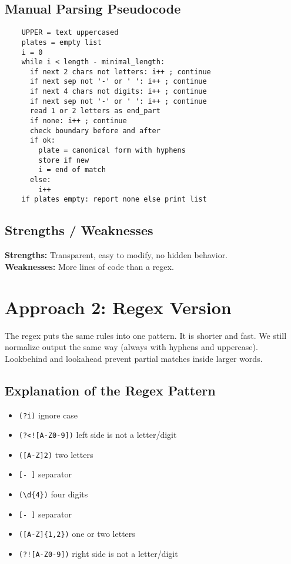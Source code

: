 \documentclass[12pt,a4paper]{article}
\begin{document}
\subsection{Manual Parsing Pseudocode}
\begin{verbatim}
    UPPER = text uppercased
    plates = empty list
    i = 0
    while i < length - minimal_length:
      if next 2 chars not letters: i++ ; continue
      if next sep not '-' or ' ': i++ ; continue
      if next 4 chars not digits: i++ ; continue
      if next sep not '-' or ' ': i++ ; continue
      read 1 or 2 letters as end_part
      if none: i++ ; continue
      check boundary before and after
      if ok:
        plate = canonical form with hyphens
        store if new
        i = end of match
      else:
        i++
    if plates empty: report none else print list
  \end{verbatim}

\subsection{Strengths / Weaknesses}
\textbf{Strengths:} Transparent, easy to modify, no hidden behavior. \\
\textbf{Weaknesses:} More lines of code than a regex.

\section{Approach 2: Regex Version}
The regex puts the same rules into one pattern. It is shorter and fast. We still normalize output the same way (always with hyphens and uppercase). Lookbehind and lookahead prevent partial matches inside larger words.

\subsection{Explanation of the Regex Pattern}
\begin{itemize}
    \item \texttt{(?i)} ignore case
    \item \texttt{(?<![A-Z0-9])} left side is not a letter/digit
    \item \texttt{([A-Z]{2})} two letters
    \item \texttt{[- ]} separator
    \item \texttt{(\textbackslash d\{4\})} four digits
    \item \texttt{[- ]} separator
    \item \texttt{([A-Z]\{1,2\})} one or two letters
    \item \texttt{(?![A-Z0-9])} right side is not a letter/digit
\end{itemize}
\end{document}

